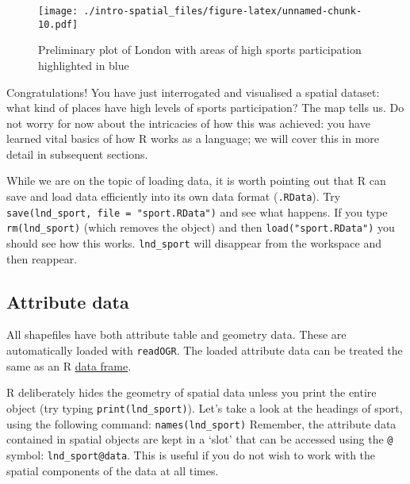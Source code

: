 \documentclass[]{article}
\newenvironment{Shaded}{}{}
\newcommand{\KeywordTok}[1]{\textcolor[rgb]{0.00,0.44,0.13}{\textbf{{#1}}}}
\newcommand{\DataTypeTok}[1]{\textcolor[rgb]{0.56,0.13,0.00}{{#1}}}
\newcommand{\DecValTok}[1]{\textcolor[rgb]{0.25,0.63,0.44}{{#1}}}
\newcommand{\StringTok}[1]{\textcolor[rgb]{0.25,0.44,0.63}{{#1}}}
\newcommand{\OtherTok}[1]{\textcolor[rgb]{0.00,0.44,0.13}{{#1}}}
\newcommand{\NormalTok}[1]{{#1}}
\begin{document}
\begin{Shaded}
\end{Shaded}

\begin{figure}[htbp]
\centering
\texttt{[image: ./intro-spatial\_files/figure-latex/unnamed-chunk-10.pdf]}
\caption{Preliminary plot of London with areas of high sports
participation highlighted in blue}
\end{figure}

Congratulations! You have just interrogated and visualised a spatial
dataset: what kind of places have high levels of sports participation?
The map tells us. Do not worry for now about the intricacies of how this
was achieved: you have learned vital basics of how R works as a
language; we will cover this in more detail in subsequent sections.

While we are on the topic of loading data, it is worth pointing out that
R can save and load data efficiently into its own data format
(\texttt{.RData}). Try \texttt{save(lnd\_sport, file = "sport.RData")}
and see what happens. If you type \texttt{rm(lnd\_sport)} (which removes
the object) and then \texttt{load("sport.RData")} you should see how
this works. \texttt{lnd\_sport} will disappear from the workspace and
then reappear.

\subsection{Attribute data}\label{attribute-data}

All shapefiles have both attribute table and geometry data. These are
automatically loaded with \texttt{readOGR}. The loaded attribute data
can be treated the same as an R
\href{http://www.statmethods.net/input/datatypes.html}{data frame}.

R deliberately hides the geometry of spatial data unless you print the
entire object (try typing \texttt{print(lnd\_sport)}). Let's take a look
at the headings of sport, using the following command:
\texttt{names(lnd\_sport)} Remember, the attribute data contained in
spatial objects are kept in a `slot' that can be accessed using the
\texttt{@} symbol: \texttt{lnd\_sport@data}. This is useful if you do
not wish to work with the spatial components of the data at all times.
\end{document}
